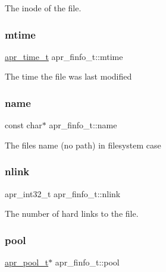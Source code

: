 The inode of the file. \mbox{\label{structapr__finfo__t_afc3bec0f6b3b10160428ba5602a41c60}} 
\subsubsection{\texorpdfstring{mtime}{mtime}}
{\footnotesize\ttfamily \mbox{\hyperlink{group__apr__time_gadb4bde16055748190eae190c55aa02bb}{apr\+\_\+time\+\_\+t}} apr\+\_\+finfo\+\_\+t\+::mtime}

The time the file was last modified \mbox{\label{structapr__finfo__t_a2915f9141ea76ae3672ccf9eb0fa77bb}} 
\subsubsection{\texorpdfstring{name}{name}}
{\footnotesize\ttfamily const char$\ast$ apr\+\_\+finfo\+\_\+t\+::name}

The file\textquotesingle{}s name (no path) in filesystem case \mbox{\label{structapr__finfo__t_a98598f28735d75aa0c1994efc825e6d9}} 
\subsubsection{\texorpdfstring{nlink}{nlink}}
{\footnotesize\ttfamily apr\+\_\+int32\+\_\+t apr\+\_\+finfo\+\_\+t\+::nlink}

The number of hard links to the file. \mbox{\label{structapr__finfo__t_a71496f86b5489c87e58e9c03fe468fb8}} 
\subsubsection{\texorpdfstring{pool}{pool}}
{\footnotesize\ttfamily \mbox{\hyperlink{group__apr__pools_gaf137f28edcf9a086cd6bc36c20d7cdfb}{apr\+\_\+pool\+\_\+t}}$\ast$ apr\+\_\+finfo\+\_\+t\+::pool}

